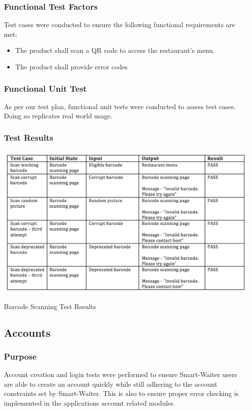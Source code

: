 \documentclass[12pt, titlepage]{article}
\begin{document}
\subsubsection{Functional Test Factors}
Test cases were conducted to ensure the following functional requirements are met:
\begin{itemize}
 \item The product shall scan a QR code to access the restaurant’s menu.
 \item The product shall provide error codes
 \end{itemize}

\subsubsection{Functional Unit Test}
As per our test plan, functional unit tests were  conducted to assess test cases. Doing so replicates real world usage.

\subsubsection{Test Results}
\break
\begin{table}[h]
\includegraphics[width=1.2\textwidth]{barcodeTable.png}
  \caption{Barcode Scanning Test Results}
\end{table}


\subsection{Accounts}
\subsubsection{Purpose}
Account creation and login tests were performed to ensure Smart-Waiter users are able to create an account quickly while still adhering to the account constraints set by Smart-Waiter. This is also to ensure proper error checking is implemented in the applications account related modules.
\end{document}
